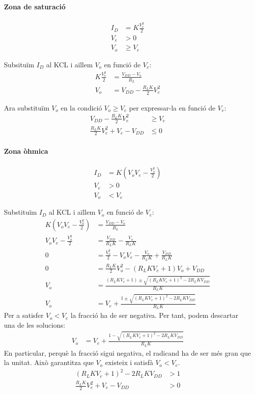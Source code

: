 \paragraph{Zona de saturació}

\begin{align*}
  I_D &= K \frac{V_e^2}{2} \\
  V_e &> 0 \\
  V_o &\geq V_e
\end{align*}

Subsituïm $I_D$ al KCL i aïllem $V_o$ en funció de $V_e$:
%
\begin{align*}
  K \frac{V_e^2}{2} &= \frac{V_{DD} - V_o}{R_L} \\
  V_o &= V_{DD} - \frac{R_L K}{2} V_e^2
\end{align*}

Ara substituïm $V_o$ en la condició $V_o \geq V_e$ per expressar-la en funció
de $V_e$:
%
\begin{align*}
  V_{DD} - \frac{R_L K}{2} V_e^2 &\geq V_e \\
  \frac{R_L K}{2} V_e^2 + V_e - V_{DD} &\leq 0
\end{align*}


\paragraph{Zona òhmica}

\begin{align*}
  I_D &= K \left( V_oV_e - \frac{V_o^2}{2} \right) \\
  V_e &> 0 \\
  V_o &< V_e
\end{align*}

Substituïm $I_D$ al KCL i aïllem $V_o$ en funció de $V_e$:
%
\begin{align*}
  K \left( V_oV_e - \frac{V_o^2}{2} \right) &= \frac{V_{DD} - V_o}{R_L} \\
  V_oV_e - \frac{V_o^2}{2} &= \frac{V_{DD}}{R_L K} - \frac{V_o}{R_L K} \\
  0 &= \frac{V_o^2}{2} - V_oV_e - \frac{V_o}{R_L K} + \frac{V_{DD}}{R_L K} \\
  0 &= \frac{R_L K}{2} V_o^2 - \left(R_L K V_e + 1\right) V_o + V_{DD} \\
  V_o &= \frac{\left(R_L K V_e + 1\right) \pm \sqrt{\left(R_L K V_e + 1\right)^2 - 2 R_L K V_{DD}}}{R_L K} \\
  V_o &= V_e + \frac{1 \pm \sqrt{\left(R_L K V_e + 1\right)^2 - 2 R_L K V_{DD}}}{R_L K}
\end{align*}
%
Per a satisfer $V_o < V_e$ la fracció ha de ser negativa. Per tant, podem
descartar una de les solucions:
%
\begin{align*}
  V_o &= V_e + \frac{1 - \sqrt{\left(R_L K V_e + 1\right)^2 - 2 R_L K V_{DD}}}{R_L K}
\end{align*}
%
En particular, perquè la fracció sigui negativa, el radicand ha de ser més gran
que la unitat. Això garantitza que $V_o$ existeix i satisfà $V_o < V_e$.
%
\begin{align*}
  \left(R_L K V_e + 1\right)^2 - 2 R_L K V_{DD} &> 1 \\
  \frac{R_L K}{2} V_e^2 + V_e - V_{DD} &> 0
\end{align*}

